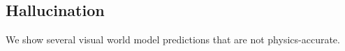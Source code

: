 
\vspace{10mm}
\subsection{Hallucination}
\label{app:sec:halluciate}

We show several visual world model predictions that are not physics-accurate.





